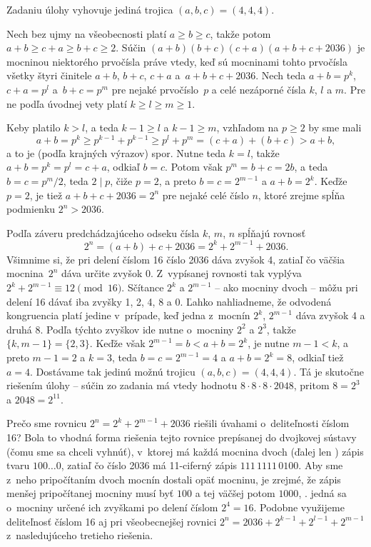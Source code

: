 {\zaver
Zadaniu úlohy vyhovuje jediná trojica $(a,b,c)=(4,4,4)$.

\ineriesenie
Nech bez ujmy na všeobecnosti platí $a \geq b \geq c$, takže potom
$a+b \geq {c+a} \geq {b+c}\geq 2$. Súčin $(a+b)(b+c)(c+a)(a+b+c+2036)$
je mocninou niektorého prvočísla práve vtedy, keď sú
mocninami tohto prvočísla všetky štyri
činitele $a+b$, $b+c$, $c+a$ a~$a+b+c+2036$. Nech teda
$a+b = p^k$, $c+a= p^l$ a~$b+c = p^m$ pre nejaké prvočíslo~$p$
a celé nezáporné čísla $k$, $l$ a $m$. Pre ne podľa úvodnej vety
platí $k \geq l \geq m \geq 1$.

Keby platilo $k>l$, a teda $k-1\geq l$ a $k-1\geq m$, vzhľadom
na $p\geq 2$ by sme mali
$$
a+b=p^k\geq p^{k-1} + p^{k-1}\geq p^l+p^m =(c+a)+(b+c)>a+b,
$$
a to je (podľa krajných výrazov) spor. Nutne teda $k=l$,
takže $a+b = p^k = p^l = c+a$, odkiaľ $b=c$. Potom však $p^m =b+c=2b$,
a teda $b=c=p^m/2$, teda $2\mid p$, čiže $p=2$,
a preto $b=c=2^{m-1}$ a $a+b=2^k$. Keďže $p=2$, je tiež $a+b+c+2036=2^n$
pre nejaké celé číslo $n$, ktoré zrejme spĺňa podmienku $2^n>2036$.

Podľa záveru predchádzajúceho odseku čísla $k$, $m$, $n$
spĺňajú rovnosť
$$
2^n = (a+b)+c+2036 = 2^k + 2^{m-1} + 2036.
$$
Všimnime si, že pri delení číslom 16 číslo 2036 dáva zvyšok 4, zatiaľ čo
väčšia mocnina~$2^n$ dáva určite zvyšok 0. Z~vypísanej rovnosti tak
vyplýva $2^k + 2^{m-1} \equiv 12 \pmod{16}$. Sčítance $2^k$ a $2^{m-1}$
-- ako mocniny dvoch -- môžu pri delení 16 dávať iba zvyšky
1, 2, 4, 8 a 0. Ľahko nahliadneme, že odvodená kongruencia platí
jedine v~prípade, keď jedna z~mocnín $2^k$, $2^{m-1}$
dáva zvyšok 4 a druhá 8. Podľa týchto zvyškov ide nutne o~mocniny
$2^2$ a $2^3$, takže $\{k,m-1\}=\{2,3\}$. Keďže však
$2^{m-1}=b<a+b=2^k$, je nutne ${m-1}<k$, a preto $m-1=2$ a $k=3$,
teda $b=c=2^{m-1}=4$ a $a+b=2^k=8$, odkiaľ tiež $a=4$.
Dostávame tak jedinú možnú trojicu $(a,b,c)=(4,4,4)$.
Tá je skutočne riešením úlohy -- súčin zo zadania má vtedy hodnotu
$8\cdot8\cdot8\cdot2048$, pritom $8=2^3$ a $2048=2^{11}$.

\poznamka
Prečo sme rovnicu $2^n =2^k + 2^{m-1} + 2036$ riešili úvahami
o~deliteľnosti číslom 16? Bola to
vhodná forma riešenia tejto rovnice prepísanej do dvojkovej sústavy
(čomu sme sa chceli vyhnúť), v~ktorej má každá mocnina dvoch (ďalej
len ) zápis tvaru $100\dots0$, zatiaľ čo číslo 2036 má
11-ciferný zápis $111\,1111\,0100$. Aby sme z~neho pripočítaním
dvoch mocnín dostali opäť mocninu, je zrejmé, že
zápis menšej pripočítanej mocniny musí byť $100$ a tej väčšej potom $1000$,
\tj. jedná sa o~mocniny určené ich zvyškami po delení číslom $2^4=16$.
Podobne využijeme deliteľnosť číslom 16
aj pri všeobecnejšej rovnici $2^n=2036+2^{k-1}+2^{l-1}+2^{m-1}$
z~nasledujúceho tretieho riešenia.

}
